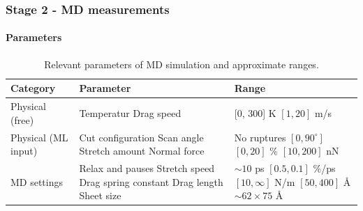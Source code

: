 \documentclass[
	10pt, %
]{beamer}
\begin{document}
\begin{frame}
	\frametitle{Stage 2 - MD measurements}
	\framesubtitle{Parameters} %
	
	\begin{table}
		\begin{tabular}{| l | p{35mm} | p{30mm} |}
			\toprule
			\textbf{Category} & \textbf{Parameter} & \textbf{Range} \\ \hline
			Physical (free) & 
			Temperatur 		 		\newline 
			Drag speed 				&
			[0, 300] K 				\newline 
			$[1, 20]$ m/s				\\ \hline

			Physical (ML input) &
			Cut configuration 		\newline
			Scan angle 				\newline
			Stretch amount 			\newline
			Normal force 			&
			No ruptures 			\newline
			$[0, 90^{\circ}]$ 		\newline
			$[0, 20]$ \% 				\newline
			$[10, 200]$ nN 			\\ \hline

			MD settings &
			Relax and pauses \newline
			Stretch speed \newline
			Drag spring constant \newline
			Drag length \newline
			Sheet size &
			$\sim 10$ ps			\newline
			$[0.5, 0.1]$ \%/ps  	\newline
			$[10, \infty]$ N/m 		\newline
			$[50, 400]$ Å 			\newline
			$\sim 62 \times 75$ Å	\\ \hline
		\end{tabular}
		\caption{Relevant parameters of MD simulation and approximate ranges.}
	\end{table}
	
	
\end{frame}



	
\end{document}
